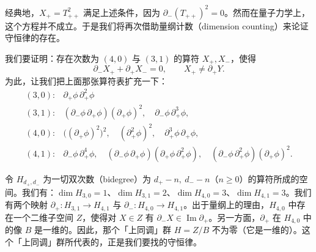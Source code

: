 

经典地，$X_+=T_{++}^2$ 满足上述条件，因为 $\partial_-(T_{++})^2=0$。然而在量子力学上，这个方程并不成立。于是我们将再次借助量纲计数（dimension counting）来论证守恒律的存在。

我们要证明：存在次数为 $(4,0)$ 与 $(3,1)$ 的算符 $X_+,X_-$，使得
\[
\partial_-X_++\partial_+X_-=0,\qquad X_+\ne\partial_+Y .
\]
为此，让我们把上面那张算符表扩充一下：
\[
\begin{array}{ll}
(3,0): & \partial_+\phi\,\partial_+^2\phi\\
(3,1): & (\partial_-\phi\,\partial_+\phi)(\partial_+\phi)^2,\quad \partial_-\phi\,\partial_+^3\phi,\\
(4,0): & \bigl((\partial_+\phi)^2\bigr)^2,\quad (\partial_+^2\phi)^2,\quad \partial_+^3\phi\,\partial_+\phi,\\
(4,1): & \partial_-\phi\,\partial_+^4\phi,\quad (\partial_-\phi\,\partial_+\phi)(\partial_+\phi\,\partial_+^2\phi),\quad (\partial_-\phi\,\partial_+^2\phi)(\partial_+\phi)^2.
\end{array}
\]

令 $H_{d_+,d_-}$ 为一切双次数（bidegree）为 $d_+-n,\ d_--n$（$n\ge0$）的算符所成的空间。我们有：$\dim H_{3,0}=1$、$\dim H_{3,1}=2$、$\dim H_{4,0}=3$、$\dim H_{4,1}=3$。我们有两个映射 $\partial_+:H_{3,1}\to H_{4,1}$ 与 $\partial_-:H_{4,0}\to H_{4,1}$。出于量纲上的理由，$H_{4,0}$ 中存在一个二维子空间 $Z$，使得对 $X\in Z$ 有 $\partial_-X\in\operatorname{Im}\partial_+$。另一方面，$\partial_+$ 在 $H_{4,0}$ 中的像 $B$ 是一维的。因此，那个「上同调」群 $H=Z/B$ 不为零（它是一维的）。这个「上同调」群所代表的，正是我们要找的守恒律。


